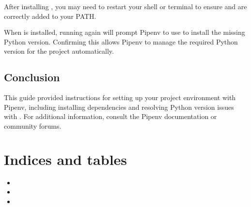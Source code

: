 \documentclass[letterpaper,10pt,english]{sphinxmanual}
\begin{document}
\sphinxAtStartPar
After installing , you may need to restart your shell or terminal to ensure  and  are correctly added to your PATH.

\sphinxAtStartPar
When  is installed, running  again will prompt Pipenv to use  to install the missing Python version. Confirming this allows Pipenv to manage the required Python version for the project automatically.


\section{Conclusion}
\label{\detokenize{setup_guide:conclusion}}
\sphinxAtStartPar
This guide provided instructions for setting up your project environment with Pipenv, including installing dependencies and resolving Python version issues with . For additional information, consult the Pipenv documentation or community forums.


\chapter{Indices and tables}
\label{\detokenize{index:indices-and-tables}}\begin{itemize}
\item {} 
\sphinxAtStartPar
{}

\item {} 
\sphinxAtStartPar
{}

\item {} 
\sphinxAtStartPar
{}

\end{itemize}



\renewcommand{\indexname}{Index}
\printindex
\end{document}
